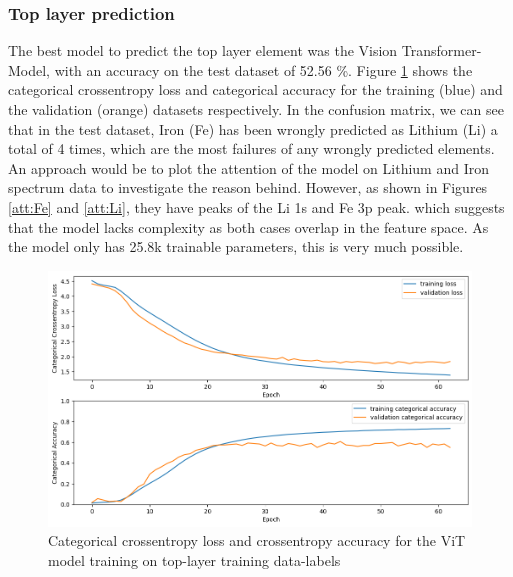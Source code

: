 \subsubsection{Top layer prediction}
The best model to predict the top layer element was the Vision Transformer-Model, with an accuracy on the test dataset of 52.56 \%. Figure \ref{fig:top_best_loss} shows the categorical crossentropy loss and categorical accuracy for the training (blue) and the validation (orange) datasets respectively. In the confusion matrix, we can see that in the test dataset, Iron (Fe) has been wrongly predicted as Lithium (Li) a total of 4 times, which are the most failures of any wrongly predicted elements. An approach would be to plot the attention of the model on Lithium and Iron spectrum data to investigate the reason behind. However, as shown in Figures \ref{att:Fe} and \ref{att:Li}, they have  peaks of the Li 1s and Fe 3p peak. which suggests that the model lacks complexity as both cases overlap in the feature space. As the model only has 25.8k trainable parameters, this is very much possible. 

\begin{figure}[H]
    \centering
    \includegraphics[width=\textwidth]{Figures/top_best_loss_acc_vit_4_32_3_4_64.png}
    \caption{Categorical crossentropy loss and crossentropy accuracy for the ViT model training on top-layer training data-labels}
    \label{fig:top_best_loss}
\end{figure}

